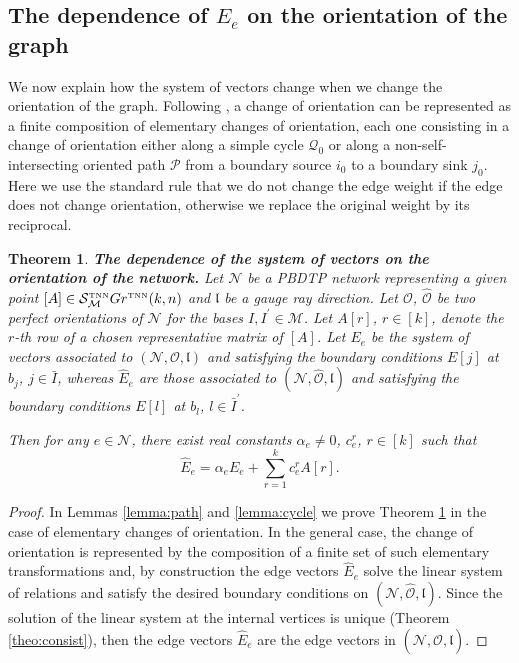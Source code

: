\documentclass[11pt]{amsart}
\theoremstyle{plain}
\numberwithin{equation}{section}
\newtheorem{theorem}{Theorem}[subsection]
\def \GTNN {{Gr^{\mbox{\tiny TNN}} (k,n)}}
\def \S {{\mathcal S}_{\mathcal M}^{\mbox{\tiny TNN}}}
\begin{document}
\subsection{The dependence of $E_e$ on the orientation of the graph}\label{sec:orient}
We now explain how the system of vectors change when we change the orientation of the graph. Following \cite{Pos}, a change of orientation can be represented as a finite composition of elementary changes of orientation, each one consisting in
a change of orientation either along a simple cycle ${\mathcal Q}_0$ or
along a non-self-intersecting oriented path ${\mathcal P}$ from a boundary source $i_0$ to a boundary sink $j_0$.
Here we use the standard rule that we do not change the edge weight if the edge does not change orientation, otherwise we replace the original weight by its reciprocal.

\begin{theorem}\label{theo:orient}\textbf{The dependence of the system of vectors on the orientation of the network.}
Let ${\mathcal N}$ be a PBDTP network representing a given point $[A]\in \S \GTNN$ and $\mathfrak l$ be a gauge ray direction. Let $\mathcal O$, ${\hat {\mathcal O}}$ be
two perfect orientations of ${\mathcal N}$ for the bases $I,I^{\prime}\in {\mathcal M}$. Let $A[r]$, $r\in [k]$, denote 
the $r$-th row of a chosen representative matrix of $[A]$.
Let $E_e$ be the system of 
vectors associated to $({\mathcal N},\mathcal O, \mathfrak l)$ and satisfying the boundary conditions $E[j]$ at $b_j$, $j \in \bar I$, whereas $\hat E_e$ are those associated to $({\mathcal N},{\hat {\mathcal O}}, \mathfrak l)$ and satisfying the boundary conditions $E[l]$ at $b_l$, $l \in \bar I^{\prime}$.  

Then for any $e\in {\mathcal N}$, there exist real constants $\alpha_e\ne 0$, $c^r_e$, $r\in [k]$ such that
\begin{equation}\label{eq:orient}
\hat E_e = \alpha_e E_e + \sum_{r=1}^k c^r_e A[r].
\end{equation}
\end{theorem}

\begin{proof}
In Lemmas \ref{lemma:path} and \ref{lemma:cycle} we prove Theorem \ref{theo:orient} in the case of elementary changes of orientation. In the general case, the change of orientation is represented by the composition of a finite set of such elementary transformations and, by construction the edge vectors $\hat E_e$ solve the linear system of relations and satisfy the desired boundary conditions on $({\mathcal N},{\hat {\mathcal O}}, \mathfrak l)$. Since the solution of the linear system at the internal vertices is unique (Theorem \ref{theo:consist}), then the edge vectors $\hat E_e$ are the edge vectors in $({\mathcal N},{\hat {\mathcal O}}, \mathfrak l)$.
\end{proof}
\end{document}
